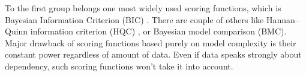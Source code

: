 \documentclass{article} %
\begin{document}
To the first group belongs 
one most widely used scoring functions, which 
is Bayesian Information Criterion (BIC) \cite{schwarz1978estimating}.
There are couple of others like Hannan–Quinn information criterion (HQC) \cite{hannan1979determination},
or Bayesian model comparison (BMC). Major drawback of scoring functions based
purely on model complexity is their constant power regardless of amount of data.
Even if data speaks strongly about dependency, such scoring functions won't take
it into account.

\end{document}

